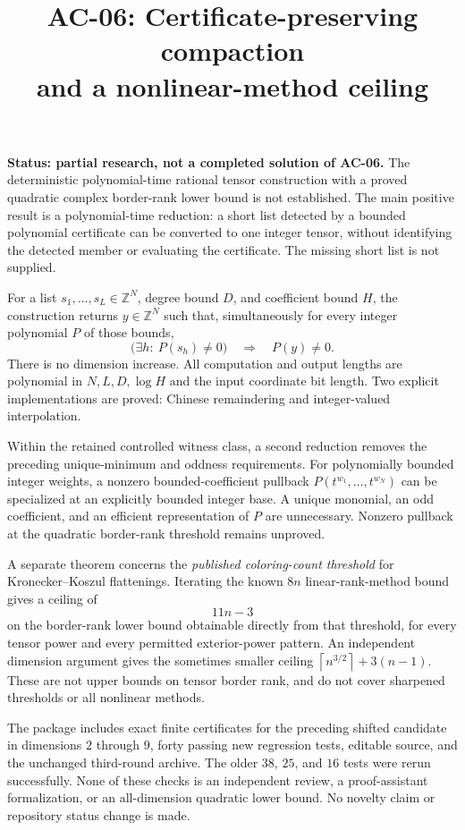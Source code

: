 \documentclass[11pt]{article}
\title{\Large\bfseries AC-06: Certificate-preserving compaction\\and a nonlinear-method ceiling}
\author{}
\date{}
\theoremstyle{definition}
\theoremstyle{remark}
\newcommand{\Z}{\mathbb Z}
\newcommand{\ceil}[1]{\left\lceil #1\right\rceil}
\begin{document}
\maketitle
\vspace{-2.5em}

\textbf{Status: partial research, not a completed solution of AC-06.}
The deterministic polynomial-time rational tensor construction with a proved quadratic complex border-rank lower bound is not established. The main positive result is a polynomial-time reduction: a short list detected by a bounded polynomial certificate can be converted to one integer tensor, without identifying the detected member or evaluating the certificate. The missing short list is not supplied.

For a list $s_1,\ldots,s_L\in\Z^N$, degree bound $D$, and coefficient bound $H$, the construction returns $y\in\Z^N$ such that, simultaneously for every integer polynomial $P$ of those bounds,
\[
 \bigl(\exists h:\ P(s_h)\ne0\bigr)\quad\Longrightarrow\quad P(y)\ne0.
\]
There is no dimension increase. All computation and output lengths are polynomial in $N,L,D,\log H$ and the input coordinate bit length. Two explicit implementations are proved: Chinese remaindering and integer-valued interpolation.

Within the retained controlled witness class, a second reduction removes the preceding unique-minimum and oddness requirements. For polynomially bounded integer weights, a nonzero bounded-coefficient pullback $P(t^{w_1},\ldots,t^{w_N})$ can be specialized at an explicitly bounded integer base. A unique monomial, an odd coefficient, and an efficient representation of $P$ are unnecessary. Nonzero pullback at the quadratic border-rank threshold remains unproved.

A separate theorem concerns the \emph{published coloring-count threshold} for Kronecker--Koszul flattenings. Iterating the known $8n$ linear-rank-method bound gives a ceiling of
\[
 11n-3
\]
on the border-rank lower bound obtainable directly from that threshold, for every tensor power and every permitted exterior-power pattern. An independent dimension argument gives the sometimes smaller ceiling $\ceil{n^{3/2}}+3(n-1)$. These are not upper bounds on tensor border rank, and do not cover sharpened thresholds or all nonlinear methods.

The package includes exact finite certificates for the preceding shifted candidate in dimensions $2$ through $9$, forty passing new regression tests, editable source, and the unchanged third-round archive. The older $38$, $25$, and $16$ tests were rerun successfully. None of these checks is an independent review, a proof-assistant formalization, or an all-dimension quadratic lower bound. No novelty claim or repository status change is made.
\end{document}
